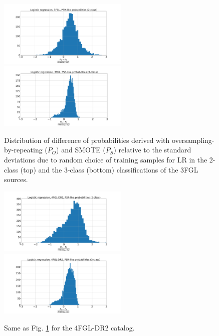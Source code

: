 \begin{figure}[h]
\centering
\hspace*{-0.5cm}
\includegraphics[width=0.55\textwidth]{plots/hist_diff_smote_LR_3FGL_2class.pdf}
\hspace*{-0.5cm}
\includegraphics[width=0.55\textwidth]{plots/hist_diff_smote_LR_3FGL_3class.pdf}
\caption{Distribution of difference  of probabilities derived with oversampling-by-repeating ($P_O$) and SMOTE ($P_S$) 
relative to the standard deviations due to random choice of training samples
for LR in the 2-class (top) and the 3-class (bottom) classifications of the 3FGL sources.
}
\label{fig:OvsS_3FGL_PSR}
\end{figure}

\begin{figure}[h]
\centering
\hspace*{-0.5cm}
\includegraphics[width=0.55\textwidth]{plots/hist_diff_smote_LR_4FGL-DR2_2class.pdf}
\hspace*{-0.5cm}
\includegraphics[width=0.55\textwidth]{plots/hist_diff_smote_LR_4FGL-DR2_3class.pdf}
\caption{Same as Fig. \ref{fig:OvsS_3FGL_PSR} for the 4FGL-DR2 catalog.
}
\label{fig:OvsS_4FGL_PSR}
\end{figure}

